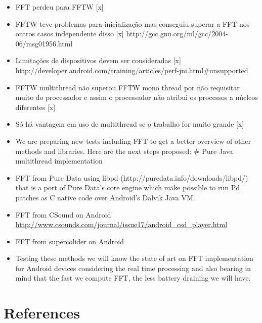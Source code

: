 \documentclass[12pt]{article}
\begin{document}
\begin{itemize}


    \item FFT perdeu para FFTW [x]


    \item FFTW teve problemas para inicialização mas conseguiu superar a FFT
    nos outros casos independente disso [x]
    http://gcc.gnu.org/ml/gcc/2004-06/msg01956.html


    \item Limitações de dispositivos devem ser consideradas [x]
    http://developer.android.com/training/articles/perf-jni.html\#unsupported


    \item FFTW  multithread não superou FFTW mono thread por não requisitar
    muito do  processador e assim o processador não atribui os processos a
    núcleos  diferentes [x]


    \item Só há vantagem em uso de multithread se o trabalho for muito grande [x]


    \item We  are preparing new tests including FFT to get a better overview
    of other  methods and libraries. Here are the next steps proposed: \# Pure
    Java multithread implementation


    \item FFT from Pure Data using libpd
    (http://puredata.info/downloads/libpd/)  that is a port of Pure Data's
    core engine which make possible to run  Pd patches as C native code over
    Android's Dalvik Java VM. 


    \item FFT from CSound on Android
    \url{http://www.csounds.com/journal/issue17/android\_csd\_player.html}


    \item FFT from supercolider on Android


    \item Testing these methods we will know the state of art on FFT
    implementation for Android devices considering the real time processing
    and also bearing in mind that the fast we compute FFT, the less battery
    draining we will have.

\end{itemize}




\section{References}




\end{document}
